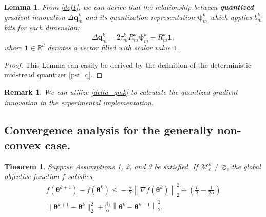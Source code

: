 \documentclass[lettersize,journal]{IEEEtran}
\newtheorem{theorem}{Theorem}
\newtheorem{lemma}{Lemma}
\newtheorem*{remark}{Remark}
\begin{document}
\begin{lemma}
\label{lemma4}
From \cref{def1}, we can derive that the relationship between \textbf{quantized} gradient innovation $\Delta \boldsymbol{q}_m^k$ and its quantization representation $\boldsymbol{\psi}_{m}^{k}$ which applies $b_m^k$ bits for each dimension:
\begin{equation}
    \Delta \boldsymbol{q}_m^k = 2 \tau_m^k R_m^k \boldsymbol{\psi}_m^k - R_m^k \boldsymbol{1},
    \label{delta_qmk}
\end{equation}
where $\boldsymbol{1} \in \mathbb{R}^d$ denotes a vector filled with scalar value $1$. 
\end{lemma}
\begin{proof}
    This Lemma can easily be derived by the definition of the deterministic mid-tread quantizer \ref{psi_q}. 
\end{proof}

\begin{remark}
    We can utilize \eqref{delta_qmk} to calculate the quantized gradient innovation in the experimental implementation.
\end{remark}


\subsection{Convergence analysis for the generally non-convex case.} 

\begin{theorem}
\label{theorem1}
Suppose Assumptions 1, 2, and 3 be satisfied. If $\mathcal{M}_c^k \neq \varnothing$, the global objective function $f$ satisfies
\begin{multline}
f(\boldsymbol{\theta}^{k+1})-f(\boldsymbol{\theta}^k)
\overset{}{\leqslant} -\frac{\alpha}{2}\left\|\nabla f(\boldsymbol{\theta}^k)\right\|_2^2  + \left( \frac{L}{2} - \frac{1}{2\alpha} \right) \\\Big\|\boldsymbol{\theta}^{k+1} - \boldsymbol{\theta}^{k} \Big\|_2^2
+ \frac{\beta\gamma}{\alpha} \left\|\boldsymbol{\theta}^{k} - \boldsymbol{\theta}^{k-1}\right\|_2^2,
\label{non_cvx}
\end{multline}
\end{theorem}
\end{document}
